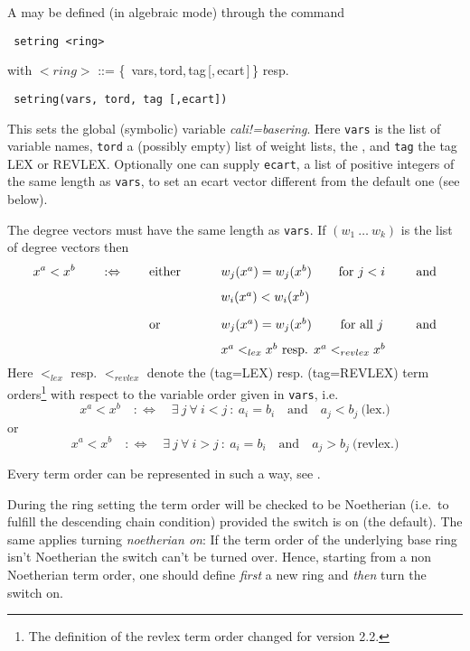A  may be defined (in algebraic mode) through the
command 
\begin{verbatim}
 setring <ring>
\end{verbatim}
with $<ring>$ ::= \{\, vars,\,tord,\,tag\,[,\,ecart\,]\,\} resp.
\begin{verbatim}
 setring(vars, tord, tag [,ecart])
\end{verbatim}
\index
This sets the global (symbolic) variable 
\emph{cali!=basering}. Here
\texttt{vars} is the list of variable names, \texttt{tord} a (possibly
empty) list of weight lists, the , and \texttt{tag}
the tag LEX or REVLEX. Optionally one can supply \texttt{ecart}, a list 
of positive integers of the same length as \texttt{vars}, to set an ecart
vector different from the default one (see below).

The degree vectors must have the same length as \texttt{vars}. If $(w_1\
\ldots\ w_k)$ is the list of degree vectors then 
\[x^a<x^b \qquad :\Leftrightarrow \qquad 
\parbox[t]{8cm}{either\hfill 
\parbox[t]{6cm}{$w_j(x^a)=w_j(x^b)$\hfill for $j<i$ \hfill and \\[8pt]
$w_i(x^a)<w_i(x^b)$} \\[10pt] or\hfill 
\parbox[t]{6cm}{$w_j(x^a)=w_j(x^b)$\hfill for all $j$ \hfill and \\[8pt]
$x^a<_{lex}x^b$ resp. $x^a<_{revlex}x^b$}}
\]
Here $<_{lex}$ resp. $<_{revlex}$ denote the
 (tag=LEX) resp. 
(tag=REVLEX) term orders\footnote{The definition of the revlex term
order changed for version 2.2.}
with respect to the variable order given in \texttt{vars}, i.e.\ 
\[x^a<x^b \quad :\Leftrightarrow \quad 
\exists\ j\ \forall\ i<j\ :\ a_i=b_i\quad\mbox{and}\quad a_j<b_j\
\mbox{(lex.)}\]
or 
\[x^a<x^b \quad :\Leftrightarrow \quad 
\exists\ j\ \forall\ i>j\ :\ a_i=b_i\quad\mbox{and}\quad a_j>b_j\
\mbox{(revlex.)}\]

Every term order can be represented in such a way, see \cite{Mora:88}.

During the ring setting the term order will be checked to be
Noetherian (i.e.\ to fulfill the descending chain condition) provided
the switch \ttindexswitch[CALI]{Noetherian} is on (the default). The same applies
turning \emph{noetherian on}: If the term order of the underlying
base ring isn't Noetherian the switch can't be turned over. Hence,
starting from a non Noetherian term order, one should define {\em
first} a new ring and \emph{then} turn the switch on. 


